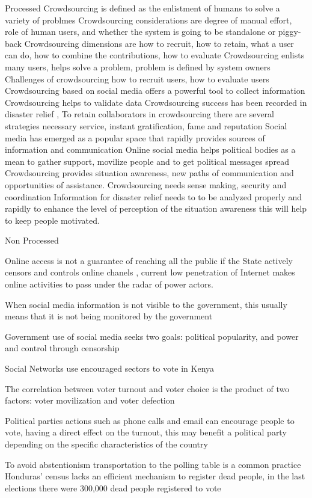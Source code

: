 Processed
Crowdsourcing is defined as the enlistment of humans to solve a variety of problmes \citep{doan2011}
Crowdsourcing considerations  are degree of manual effort, role of human users, and whether the system is going to be standalone or piggy-back \citep{doan2011}
Crowdsourcing dimensions are how to recruit, how to retain, what a user can do, how to combine the contributions, how to evaluate \citep{doan2011}
Crowdsourcing enlists many users, helps solve a problem, problem is defined by system owners \citep{doan2011}
Challenges of crowdsourcing how to recruit users, how to evaluate users \citep{doan2011}
Crowdsourcing based on social media offers a powerful tool to collect information \citep{gao2011}
Crowdsourcing helps to validate data \citep{gao2011}
Crowdsourcing success has been recorded in disaster relief \citep{yin2012}, 
To retain collaborators in crowdsourcing there are several strategies necessary service, instant gratification, fame and reputation \citep{doan2011}
Social media has emerged as a popular space that rapidly provides sources of information and communication \citep{yin2012}
Online social media helps political bodies as a mean to gather support, movilize people and to get political messages spread \citep{map2014}
Crowdsourcing provides situation awareness, new paths of communication and opportunities of assistance. Crowdsourcing needs sense making, security and coordination \citep{gao2011}
Information for disaster relief needs to to be analyzed properly and rapidly to enhance the level of perception of the situation awareness \citep{yin2012} this will help to keep people motivated.



Non Processed

Online access is not a guarantee of reaching all the public if the State actively censors and controls online chanels \citep{map2014}, current low penetration of Internet makes online activities to pass under the radar of power actors.

When social media information is not visible to the government, this usually means that it is not being monitored by the government \citep{yin2012}

Government use of social media seeks two goals:  political popularity, and power and control through censorship \citep{saadia2014}

Social Networks use encouraged sectors to vote in Kenya \citep{map2014}

The correlation between voter turnout and voter choice is the product of two factors: voter movilization and voter defection \citep{osborn2010}

Political parties actions such as phone calls and email can encourage people to vote, having a direct effect on the turnout, this may benefit a political party depending on the specific characteristics of the country \citep{osborn2010}

To avoid abstentionism transportation to the polling table is a common practice \citep{romero2014}
Honduras' census lacks an efficient mechanism to register dead people, in the last elections there were 300,000 dead people registered to vote \citep{romero2014}